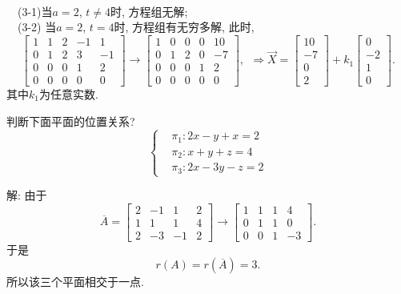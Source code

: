 \begin{eg}
\\ \ \ (3-1)当$a=2$, $t\not=4$时, 方程组无解;\\
\ \ (3-2) 当$a=2$, $t=4$时, 方程组有无穷多解, 此时,
\begin{displaymath}
\begin{bmatrix} 1&1&2&-1&1\\0&1&2&3&-1\\0&0&0&1&2\\0&0&0&0&0\end{bmatrix}
\rightarrow\begin{bmatrix}1&0&0&0&10\\0&1&2&0&-7\\0&0&0&1&2\\0&0&0&0&0\end{bmatrix},\ \ \Rightarrow \vec{X}=\begin{bmatrix}10\\-7\\0\\2\end{bmatrix}+k_1\begin{bmatrix}0\\-2\\1\\0\end{bmatrix}.
\end{displaymath}
其中$k_1$为任意实数.
\end{eg}


\begin{eg}
判断下面平面的位置关系?
\begin{displaymath}
\left\{\begin{aligned}
&\pi_1:2x-y+x=2\\
&\pi_2:x+y+z=4\\
&\pi_3:2x-3y-z=2\end{aligned}\right.\end{displaymath}

解: 由于
\begin{displaymath}
\overline{A}=\begin{bmatrix}2&-1&1&2\\1&1&1&4\\2&-3&-1&2\end{bmatrix}\rightarrow
\begin{bmatrix}1&1&1&4\\0&1&1&0\\0&0&1&-3\end{bmatrix}.\end{displaymath}
于是$$r(A)=r(\overline{A})=3.$$
所以该三个平面相交于一点.
\end{eg}

